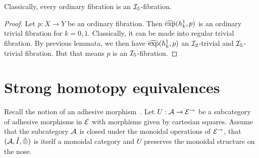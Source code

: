 \documentclass[reqno,10pt,a4paper,oneside]{amsart}
\begin{document}
\begin{lemma}
Classically, every ordinary fibration is an $\cal{I}_5$-fibration.
\end{lemma}

\begin{proof}
Let $p : X \to Y$ be an ordinary fibration.
Then $\hatexp(h_k^1, p)$ is an ordinary trivial fibration for $k = 0, 1$.
Classically, it can be made into regular trivial fibration.
By previous lemmata, we then have $\hatexp(h_k^1, p)$ an $\cal{I}_2$-trivial and $\cal{I}_5$-trivial fibration.
But that means $p$ is an $\cal{I}_5$-fibration.
\end{proof}


\section{Strong homotopy equivalences}

\medskip


Recall the notion of an adhesive morphism~\cite{garner-lack:adhesive}.  Let $U : \cal{A} \to \catE^{\to}$ be a subcategory of adhesive morphisms in $\catE$ with morphisms given by cartesian squares. Assume that the subcategory $\cal{A}$ is closed under the monoidal operations of $\catE^{\to}$, \ie that $(\cal{A}, \hatunit, \hatotimes)$ is itself a monoidal category and $U$ preserves the monoidal structure on the nose. 

\newpage











\end{document}

